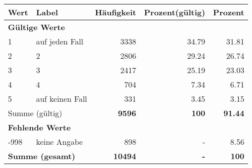      \begin{longtable}{lXrrr}
     \toprule
     \textbf{Wert} & \textbf{Label} & \textbf{Häufigkeit} & \textbf{Prozent(gültig)} & \textbf{Prozent} \\
     \endhead
     \midrule
     \multicolumn{5}{l}{\textbf{Gültige Werte}}\\

     1 &
     \multicolumn{1}{X}{ auf jeden Fall   } &


       \num{3338} &
       \num[round-mode=places,round-precision=2]{34,79} &
         \num[round-mode=places,round-precision=2]{31,81} \\

     2 &
     \multicolumn{1}{X}{ 2   } &


       \num{2806} &
       \num[round-mode=places,round-precision=2]{29,24} &
         \num[round-mode=places,round-precision=2]{26,74} \\

     3 &
     \multicolumn{1}{X}{ 3   } &


       \num{2417} &
       \num[round-mode=places,round-precision=2]{25,19} &
         \num[round-mode=places,round-precision=2]{23,03} \\

     4 &
     \multicolumn{1}{X}{ 4   } &


       \num{704} &
       \num[round-mode=places,round-precision=2]{7,34} &
         \num[round-mode=places,round-precision=2]{6,71} \\

     5 &
     \multicolumn{1}{X}{ auf keinen Fall   } &


       \num{331} &
       \num[round-mode=places,round-precision=2]{3,45} &
         \num[round-mode=places,round-precision=2]{3,15} \\
     \midrule
     \multicolumn{2}{l}{Summe (gültig)} &
       \textbf{\num{9596}} &
     \textbf{100} &
       \textbf{\num[round-mode=places,round-precision=2]{91,44}} \\
     \multicolumn{5}{l}{\textbf{Fehlende Werte}}\\
       -998 &
       keine Angabe &
         \num{898} &
        - &
         \num[round-mode=places,round-precision=2]{8,56} \\
     \midrule
     \multicolumn{2}{l}{\textbf{Summe (gesamt)}} &
          \textbf{\num{10494}} &
        \textbf{-} &
        \textbf{100} \\
     \bottomrule
     \end{longtable}
     
